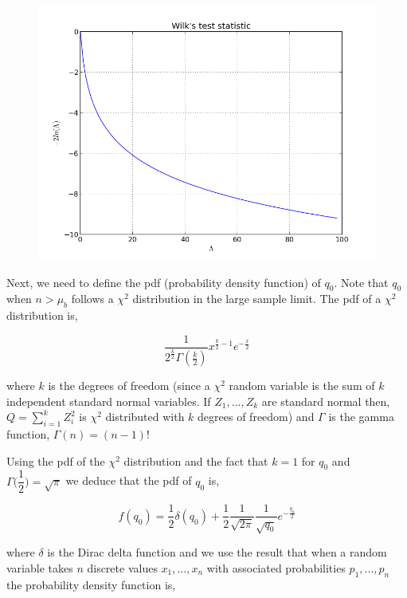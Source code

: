 \documentclass[a4paper,twoside]{report}
\begin{document}
\begin{figure}
\includegraphics[scale=0.6]{images/wilks.png}
\end{figure}

Next, we need to define the pdf (probability density function) of $q_{0}$. Note that $q_{0}$ when $n > \mu_{b}$ follows a $\chi^{2}$ distribution in the large sample limit. The pdf of a $\chi^{2}$ distribution is, 

\begin{equation}
\dfrac{1}{2^{\frac{k}{2}}\Gamma(\frac{k}{2})}x^{\frac{k}{2} - 1}e^{-\frac{x}{2}}
\end{equation}

where $k$ is the degrees of freedom (since a $\chi^{2}$ random variable is the sum of $k$ independent standard normal variables. If $Z_{1},...,Z_{k}$ are standard normal then, $Q = \sum_{i=1}^{k}Z_{i}^{2}$ is $\chi^{2}$ distributed with $k$ degrees of freedom) and $\Gamma$ is the gamma function, $\Gamma(n) = (n-1)!$

Using the pdf of the $\chi^{2}$ distribution and the fact that $k = 1$ for $q_{0}$ and $\Gamma\bigg(\dfrac{1}{2}\bigg) = \sqrt{\pi}$ we deduce that the pdf of $q_{0}$ is,

\begin{equation}
f(q_{0}) = \frac{1}{2}\delta(q_{0}) + \frac{1}{2}\frac{1}{\sqrt{2\pi}}\frac{1}{\sqrt{q_{0}}}e^{-\frac{q_{0}}{2}}
\end{equation}

where $\delta$ is the Dirac delta function and we use the result that when a random variable takes $n$ discrete values $x_{1},...,x_{n}$ with associated probabilities $p_{1},...,p_{n}$ the probability density function is,
\end{document}
